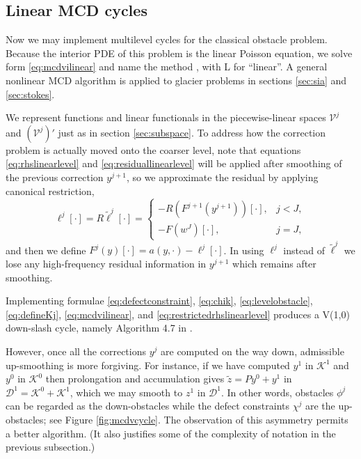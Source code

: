 \documentclass[letterpaper,final,12pt,reqno]{amsart}
\theoremstyle{claim}
\numberwithin{equation}{section}
\numberwithin{figure}{section}
\numberwithin{table}{section}
\numberwithin{theorem}{section}
\begin{document}
\subsection{Linear MCD cycles} \label{subsec:mcdl}  Now we may implement multilevel cycles for the classical obstacle problem.  Because the interior PDE of this problem is the linear Poisson equation, we solve form \eqref{eq:mcdvilinear} and name the method , with L for ``linear''.  A general nonlinear MCD algorithm is applied to glacier problems in sections \ref{sec:sia} and \ref{sec:stokes}.

We represent functions and linear functionals in the piecewise-linear spaces $\mathcal{V}^j$ and $(\mathcal{V}^j)'$ just as in section \ref{sec:subspace}.  To address how the correction problem is actually moved onto the coarser level, note that equations \eqref{eq:rhslinearlevel} and \eqref{eq:residuallinearlevel} will be applied after smoothing of the previous correction $y^{j+1}$, so we approximate the residual by applying canonical restriction,
\begin{equation}
\ell^j[\cdot] = R \tilde\ell^j[\cdot] = \begin{cases} - R(F^{j+1}(y^{j+1}))[\cdot], & j < J, \\
                                                      - F(w^J)[\cdot],   & j = J, \end{cases} \label{eq:restrictedrhslinearlevel}
\end{equation}
and then we define $F^j(y)[\cdot] = a(y,\cdot) - \ell^j[\cdot]$.  In using $\ell^j$ instead of $\tilde\ell^j$ we lose any high-frequency residual information in $y^{j+1}$ which remains after smoothing.

Implementing formulae \eqref{eq:defectconstraint}, \eqref{eq:chik}, \eqref{eq:levelobstacle}, \eqref{eq:defineKj}, \eqref{eq:mcdvilinear}, and \eqref{eq:restrictedrhslinearlevel} produces a V(1,0) down-slash cycle, namely Algorithm 4.7 in \cite{GraeserKornhuber2009}.

However, once all the corrections $y^j$ are computed on the way down, admissible up-smoothing is more forgiving.  For instance, if we have computed $y^1$ in $\mathcal{K}^1$ and $y^0$ in $\mathcal{K}^0$ then prolongation and accumulation gives $\tilde z = P y^0 + y^1$ in $\mathcal{D}^1 = \mathcal{K}^0 + \mathcal{K}^1$, which we may smooth to $z^1$ in $\mathcal{D}^1$.  In other words, obstacles $\phi^j$ can be regarded as the down-obstacles while the defect constraints $\chi^j$ are the up-obstacles; see Figure \ref{fig:mcdvcycle}.  The observation of this asymmetry permits a better algorithm.  (It also justifies some of the complexity of notation in the previous subsection.)
\end{document}
